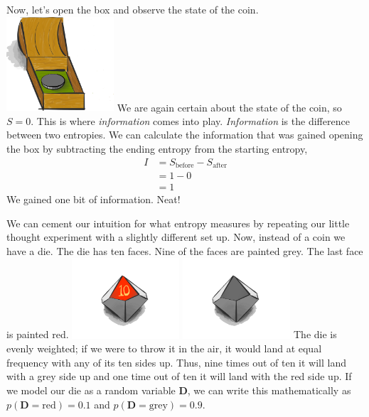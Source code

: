 Now, let's open the box and observe the state of the coin.
\includegraphics[width=0.3\textwidth]{img/big-box-open-coin}
We are again certain about the state of the coin, so $S = 0$.
This is where \textit{information} comes into play.
\textit{Information} is the difference between two entropies.
We can calculate the information that was gained opening the box by subtracting the ending entropy from the starting entropy,
\begin{align*}
I
&= S_{\text{before}} - S_{\text{after}} \\
&= 1 - 0 \\
&= 1
\end{align*}
We gained one bit of information.
Neat!

We can cement our intuition for what entropy measures by repeating our little thought experiment with a slightly different set up.
Now, instead of a coin we have a die.
The die has ten faces.
Nine of the faces are painted grey.
The last face is painted red.
\includegraphics[width=0.3\textwidth]{img/red-die}
\includegraphics[width=0.3\textwidth]{img/grey-die}
The die is evenly weighted;
if we were to throw it in the air, it would land at equal frequency with any of its ten sides up.
Thus, nine times out of ten it will land with a grey side up and one time out of ten it will land with the red side up.
If we model our die as a random variable $\bm{D}$, we can write this mathematically as $p(\bm{D} = \text{red}) = 0.1$ and $p(\bm{D} = \text{grey}) = 0.9$.

